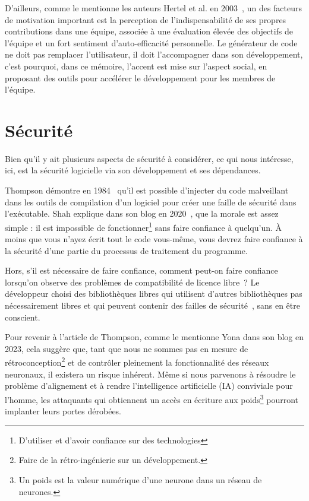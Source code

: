 D'ailleurs, comme le mentionne les auteurs Hertel et al. en 2003~\cite{HERTEL20031159}, un des facteurs de motivation important est la perception de l'indispensabilité de ses propres contributions dans une équipe, associée à une évaluation élevée des objectifs de l'équipe et un fort sentiment d'auto-efficacité personnelle. Le générateur de code ne doit pas remplacer l'utilisateur, il doit l'accompagner dans son développement, c'est pourquoi, dans ce mémoire, l'accent est mise sur l'aspect social, en proposant des outils pour accélérer le développement pour les membres de l'équipe.

\section{Sécurité}

Bien qu'il y ait plusieurs aspects de sécurité à considérer, ce qui nous intéresse, ici, est la sécurité logicielle via son développement et ses dépendances.

Thompson démontre en 1984~\cite{thompson_trusting_1984} qu'il est possible d'injecter du code malveillant dans les outils de compilation d'un logiciel pour créer une faille de sécurité dans l'exécutable. Shah explique dans son blog en 2020~\cite{discussion_reflection_trusting_2020}, que la morale est assez simple : il est impossible de fonctionner\footnote{D'utiliser et d'avoir confiance sur des technologies} sans faire confiance à quelqu'un. À moins que vous n'ayez écrit tout le code vous-même, vous devrez faire confiance à la sécurité d'une partie du processus de traitement du programme.

Hors, s'il est nécessaire de faire confiance, comment peut-on faire confiance lorsqu'on observe des problèmes de compatibilité de licence libre~\cite{pfeiffer2022license}\cite{8667977}? Le développeur choisi des bibliothèques libres qui utilisent d'autres bibliothèques pas nécessairement libres et qui peuvent contenir des failles de sécurité~\cite{10.1145/3133956.3134048}, sans en être conscient. 

Pour revenir à l'article de Thompson, comme le mentionne Yona dans son blog en 2023, cela suggère que, tant que nous ne sommes pas en mesure de rétroconception\footnote{Faire de la rétro-ingénierie sur un développement.} et de contrôler pleinement la fonctionnalité des réseaux neuronaux, il existera un risque inhérent. Même si nous parvenons à résoudre le problème d'alignement et à rendre l'intelligence artificielle (IA) conviviale pour l'homme, les attaquants qui obtiennent un accès en écriture aux poids\footnote{Un poids est la valeur numérique d'une neurone dans un réseau de neurones.} pourront implanter leurs portes dérobées.~\cite{discussion_reflection_trusting_ia_2023}

